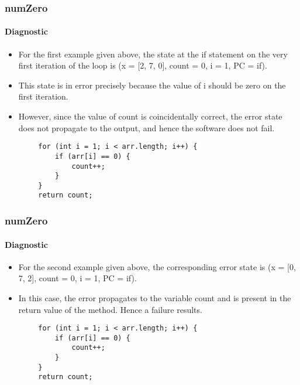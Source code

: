 \begin{frame}[fragile]
\frametitle{numZero}
\framesubtitle{Diagnostic}

\begin{itemize}
	\item For the first example given above, the state at the if statement on
	the very first iteration of the loop is (x = [2, 7, 0], count = 0, i = 1,
	PC = if).

	\item This state is in error precisely because the value of i should be
	zero on the first iteration.

	\item However, since the value of count is coincidentally correct, the
	error state does not propagate to the output, and hence the software does
	not fail.
\end{itemize}

\begin{lstlisting}
        for (int i = 1; i < arr.length; i++) {
            if (arr[i] == 0) {
                count++;
            }
        }
        return count;
\end{lstlisting}
\end{frame}


\begin{frame}[hasprev=true, hasnext=false, fragile]
\frametitle{numZero}
\framesubtitle{Diagnostic}

\begin{itemize}
	\item For the second example given above, the corresponding error state is
	(x = [0, 7, 2], count = 0, i = 1, PC = if).

	\item In this case, the error propagates to the variable count and is
	present in the return value of the method. Hence a failure results.
\end{itemize}

\begin{lstlisting}
        for (int i = 1; i < arr.length; i++) {
            if (arr[i] == 0) {
                count++;
            }
        }
        return count;
\end{lstlisting}
\end{frame}


